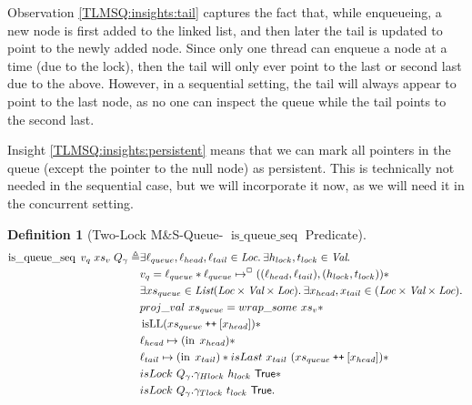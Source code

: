 \documentclass[a4paper, 11pt]{report}
\newtheorem{definition}{Definition}[section]
\newcommand{\tlmsq}{Two-Lock M\&S-Queue\xspace}
\newcommand{\isqueueseq}{\operatorname{is\_queue\_seq}}
\newcommand{\isLL}{\operatorname{isLL}}
\newcommand{\nIn}[1]{\operatorname{in} \; #1}
\newcommand{\Hlock}{h_{lock}}
\newcommand{\Tlock}{t_{lock}}
\newcommand\catenate{\mathbin{\text{\ttfamily\upshape ++}}}
\begin{document}
Observation \ref{TLMSQ:insights:tail} captures the fact that, while enqueueing, a new node is first added to the linked list, and then later the tail is updated to point to the newly added node. Since only one thread can enqueue a node at a time (due to the lock), then the tail will only ever point to the last or second last due to the above. However, in a sequential setting, the tail will always appear to point to the last node, as no one can inspect the queue while the tail points to the second last.

Insight \ref{TLMSQ:insights:persistent} means that we can mark all pointers in the queue (except the pointer to the null node) as persistent. This is technically not needed in the sequential case, but we will incorporate it now, as we will need it in the concurrent setting.

\begin{definition}[\tlmsq - $\isqueueseq$ Predicate]\label{TLMSQ:spec:isqueueseq}
\begin{align*}
  \isqueueseq \; v_q \; xs_v \; Q_\gname \eqdef &\Exists \loc_{queue}, \loc_{head}, \loc_{tail} \in \Loc . \Exists \Hlock, \Tlock \in \Val . \\
  &v_q = \loc_{queue} \star \loc_{queue} \mapsto^{\persistently} ((\loc_{head}, \loc_{tail}), (\Hlock, \Tlock)) \star\\
  &\Exists xs_{queue} \in \List (\Loc \times \Val \times \Loc) . \Exists x_{head}, x_{tail} \in (\Loc \times \Val \times \Loc) .\\
	&proj\_val \ xs_{queue} = wrap\_some \ xs_v \star\\
	&\isLL (xs_{queue} \catenate [x_{head}]) \star\\
	&\loc_{head} \mapsto (\nIn{x_{head}}) \star\\
	&\loc_{tail} \mapsto (\nIn{x_{tail}}) \star isLast \ x_{tail} \ (xs_{queue} \catenate [x_{head}]) \star\\
	&isLock \ Q_\gname.\gname_{Hlock} \ \Hlock \ \TRUE \star\\
	&isLock \ Q_\gname.\gname_{Tlock} \ \Tlock \ \TRUE.
\end{align*}
\end{definition}
\end{document}
